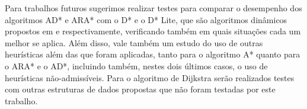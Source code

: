 Para trabalhos futuros sugerimos realizar testes para comparar o desempenho dos algoritmos AD* e ARA* com o D* e o D* Lite, que são algoritmos dinâmicos propostos em  e  respectivamente, verificando também em quais situações cada um melhor se aplica. Além disso, vale também um estudo do uso de outras heurísticas além das que foram aplicadas, tanto para o algoritmo A* quanto para o ARA* e o AD*, incluindo também, nestes dois últimos casos, o uso de heurísticas não-admissíveis. Para o algoritmo de Dijkstra serão realizados testes com outras estruturas de dados propostas que não foram testadas por este trabalho.